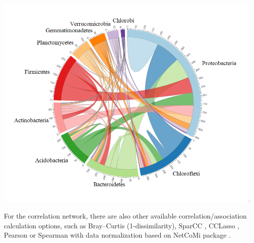 \documentclass[
]{book}
\newenvironment{Shaded}{\begin{snugshade}}{\end{snugshade}}
\newcommand{\AttributeTok}[1]{\textcolor[rgb]{0.77,0.63,0.00}{#1}}
\newcommand{\CommentTok}[1]{\textcolor[rgb]{0.56,0.35,0.01}{\textit{#1}}}
\newcommand{\ConstantTok}[1]{\textcolor[rgb]{0.00,0.00,0.00}{#1}}
\newcommand{\DecValTok}[1]{\textcolor[rgb]{0.00,0.00,0.81}{#1}}
\newcommand{\FunctionTok}[1]{\textcolor[rgb]{0.00,0.00,0.00}{#1}}
\newcommand{\NormalTok}[1]{#1}
\newcommand{\SpecialCharTok}[1]{\textcolor[rgb]{0.00,0.00,0.00}{#1}}
\newcommand{\StringTok}[1]{\textcolor[rgb]{0.31,0.60,0.02}{#1}}
\begin{document}
\begin{Shaded}
\end{Shaded}

\begin{center}\includegraphics[width=700px]{Images/trans_network_sum_links} \end{center}

For the correlation network, there are also other available correlation/association calculation options,
such as Bray--Curtis (1-dissimilarity), SparCC \citep{Friedman_Inferring_2012}, CCLasso \citep{Fang_CCLasso_2015},
Pearson or Spearman with data normalization based on NetCoMi package \citep{Peschel_NetCoMi_2021}.
\end{document}
